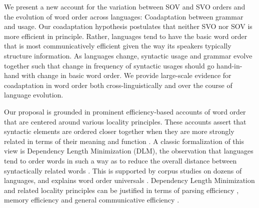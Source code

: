 \documentclass[9pt,twocolumn,twoside,lineno]{pnas-new}
\begin{document}


We present a new account for the variation between SOV and SVO orders and the evolution of word order across languages: Coadaptation between grammar and usage. Our coadaptation hypothesis postulates that neither SVO nor SOV is more efficient in principle.
Rather, languages tend to have the basic word order that is most communicatively efficient given the way its speakers typically structure information. As languages change, syntactic usage and grammar evolve together such that change in frequency of syntactic usages should go hand-in-hand with change in basic word order. We provide large-scale evidence for coadaptation in word order both cross-linguistically and over the course of language evolution.

Our proposal is grounded in prominent efficiency-based accounts of word order that are centered around various locality principles. These accounts assert that syntactic elements are ordered closer together when they are more strongly related in terms of their meaning and function \citep{behaghel1932deutsche,givon1985iconicity,rijkhoff-word-1986,hawkins-performance-1994}.
A classic formalization of this view is Dependency Length Minimization (DLM), the observation that languages tend to order words in such a way as to reduce the overall distance between syntactically related words \citep{rijkhoff-word-1986,hawkins-performance-1994,liu2008dependency,futrell-cross-linguistic-2015, liu-dependency-2017, futrell2020dependency}.
This is supported by corpus studies on dozens of languages, and explains word order universals \citep{rijkhoff-word-1986, hawkins-performance-1994, hahn2020universals}.
Dependency Length Minimization and related locality principles can be justified in terms of parsing efficiency \citep{hawkins-performance-1994}, memory efficiency \citep{gibson-linguistic-1998} and general communicative efficiency \citep{hahn2020universals}.
\end{document}
